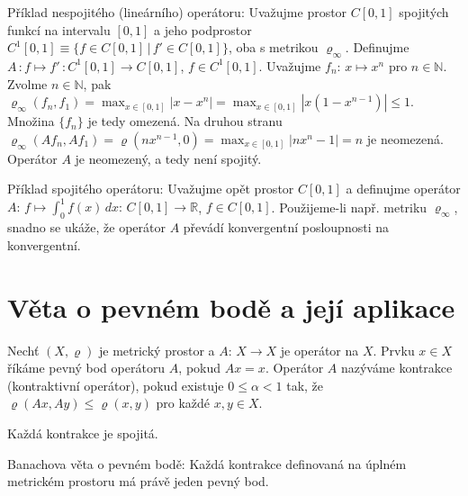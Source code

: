 \begin{ex}
   Příklad nespojitého (lineárního) operátoru:
   Uvažujme prostor $C[0,1]$ spojitých funkcí na intervalu $[0,1]$
   a jeho podprostor $C^1[0,1]\equiv\{f\in C[0,1]\,|\,f'\in C[0,1]\}$,
   oba s metrikou $\varrho_{\infty}$.
   Definujme $A\,:f\mapsto f'\,:C^1[0,1]\rightarrow C[0,1]$, $f\in C^1[0,1]$.
   Uvažujme $f_n:\,x\mapsto x^n$ pro $n\in\mathbb{N}$.
   Zvolme $n\in\mathbb{N}$,
   pak $\varrho_{\infty}(f_n,f_1)=\max_{x\in[0,1]}|x-x^n|=
   \max_{x\in[0,1]}|x(1-x^{n-1})|\leq 1$.
   Množina $\{f_n\}$ je tedy omezená.
   Na druhou stranu $\varrho_{\infty}(Af_n,Af_1)=\varrho(nx^{n-1},0)=
   \max_{x\in[0,1]}|nx^n-1|=n$ je neomezená.
   Operátor $A$ je neomezený, a tedy není spojitý.
\end{ex}

\begin{ex}
   Příklad spojitého operátoru:
   Uvažujme opět prostor $C[0,1]$
   a definujme operátor $A:\,f\mapsto\int_0^1f(x)\,dx:
   \,C[0,1]\rightarrow\mathbb{R}$, $f\in C[0,1]$.
   Použijeme-li např. metriku $\varrho_{\infty}$,
   snadno se ukáže, že operátor $A$ převádí konvergentní posloupnosti
   na konvergentní.
\end{ex}

\section{Věta o pevném bodě a její aplikace}

Nechť $(X,\varrho)$ je metrický prostor a $A:\,X\rightarrow X$ je operátor na $X$.
Prvku $x\in X$ říkáme pevný bod operátoru $A$, pokud $Ax=x$.
Operátor $A$ nazýváme kontrakce (kontraktivní operátor), pokud existuje
$0\leq \alpha <1$ tak, že $\varrho(Ax,Ay)\leq\varrho(x,y)$ pro každé $x,y\in X$.

Každá kontrakce je spojitá.

Banachova věta o pevném bodě:
Každá kontrakce definovaná na úplném metrickém prostoru má právě jeden pevný bod.

